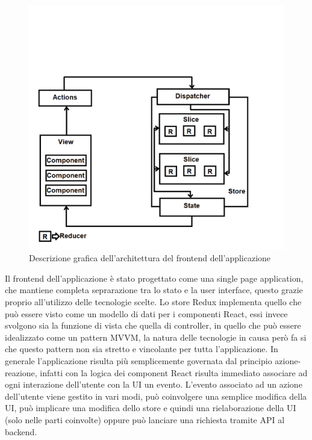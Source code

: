 \begin{figure}[H]
  \centering
  \includegraphics[width=\textwidth]{immagini/architettura-frontend.png}
  \caption{Descrizione grafica dell'architettura del frontend dell'applicazione}
\end{figure}

Il frontend dell'applicazione è stato progettato come una single page application, che mantiene completa seprarazione tra lo stato e la user interface, questo grazie proprio
all'utilizzo delle tecnologie scelte. Lo store Redux implementa quello che può essere visto come un modello di dati per i componenti React, essi invece svolgono sia la funzione
di vista che quella di controller, in quello che può essere idealizzato come un pattern \gls{MVVM}\glsfirstoccur, la natura delle tecnologie in causa però fa si che questo
pattern non sia stretto e vincolante per tutta l'applicazione. In generale l'applicazione risulta più semplicemente governata dal principio azione-reazione, infatti con la logica dei
component React risulta immediato associare ad ogni interazione dell'utente con la UI un evento. L'evento associato ad un azione dell'utente viene gestito in vari modi,
può coinvolgere una semplice modifica della UI, può implicare una modifica dello store e quindi una rielaborazione della UI (solo nelle parti coinvolte) oppure può lanciare una
richiesta tramite API al backend.
\newpage
